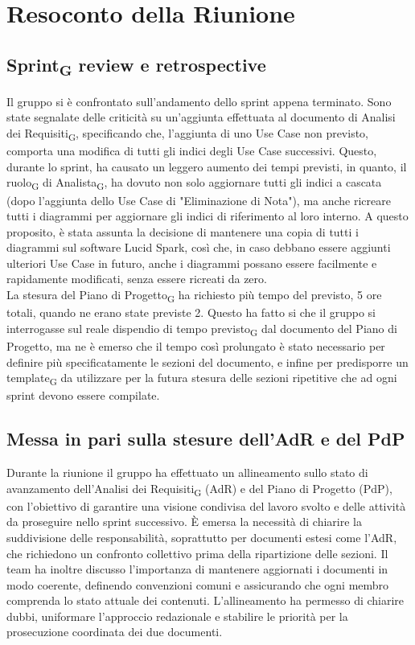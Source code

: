 \section{Resoconto della Riunione}
\subsection{Sprint\textsubscript{G} review e retrospective}
Il gruppo si è confrontato sull'andamento dello sprint appena terminato. Sono state segnalate delle criticità su un'aggiunta effettuata al documento di Analisi dei Requisiti\textsubscript{G}, specificando che, l'aggiunta di uno Use Case non previsto, comporta una modifica di tutti gli indici degli Use Case successivi. Questo, durante lo sprint, ha causato un leggero aumento dei tempi previsti, in quanto, il ruolo\textsubscript{G} di Analista\textsubscript{G}, ha dovuto non solo aggiornare tutti gli indici a cascata (dopo l'aggiunta dello Use Case di "Eliminazione di Nota"), ma anche ricreare tutti i diagrammi per aggiornare gli indici di riferimento al loro interno. A questo proposito, è stata assunta la decisione di mantenere una copia di tutti i diagrammi sul software Lucid Spark, così che, in caso debbano essere aggiunti ulteriori Use Case in futuro, anche i diagrammi possano essere facilmente e rapidamente modificati, senza essere ricreati da zero. \\
La stesura del Piano di Progetto\textsubscript{G} ha richiesto più tempo del previsto, 5 ore totali, quando ne erano state previste 2. Questo ha fatto si che il gruppo si interrogasse sul reale dispendio di tempo previsto\textsubscript{G} dal documento del Piano di Progetto, ma ne è emerso che il tempo così prolungato è stato necessario per definire più specificatamente le sezioni del documento, e infine per predisporre un template\textsubscript{G} da utilizzare per la futura stesura delle sezioni ripetitive che ad ogni sprint devono essere compilate.

\subsection{Messa in pari sulla stesure dell'AdR e del PdP}
Durante la riunione il gruppo ha effettuato un 
allineamento sullo stato di avanzamento 
dell’Analisi dei Requisiti\textsubscript{G} (AdR) e del Piano 
di Progetto (PdP), con l’obiettivo di garantire 
una visione condivisa del lavoro svolto e delle 
attività da proseguire nello sprint successivo. 
È emersa la necessità di chiarire la suddivisione 
delle responsabilità, soprattutto per documenti 
estesi come l’AdR, che richiedono un confronto 
collettivo prima della ripartizione delle sezioni. 
Il team ha inoltre discusso 
l’importanza di mantenere aggiornati i 
documenti in modo coerente, definendo convenzioni 
comuni e assicurando che ogni 
membro comprenda lo stato attuale dei contenuti. 
L’allineamento ha permesso di chiarire dubbi, 
uniformare l’approccio redazionale e stabilire le 
priorità per la prosecuzione coordinata dei due documenti.

